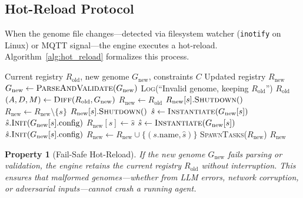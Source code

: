 \documentclass{article}
\newcommand{\REQUIRE}{\Require}
\newcommand{\ENSURE}{\Ensure}
\newtheorem{property}{Property}
\begin{document}
\subsection{Hot-Reload Protocol}

When the genome file changes---detected via filesystem watcher (\texttt{inotify} on Linux) or MQTT signal---the engine executes a hot-reload. Algorithm~\ref{alg:hot_reload} formalizes this process.

\begin{algorithm}[t]
\caption{Genome Hot-Reload with Consistency Guarantee}
\label{alg:hot_reload}
\begin{algorithmic}[1]
\REQUIRE Current registry $R_{\text{old}}$, new genome $G_{\text{new}}$, constraints $C$
\ENSURE Updated registry $R_{\text{new}}$
\State $G_{\text{new}} \leftarrow \textsc{ParseAndValidate}(G_{\text{new}})$
    \State \textsc{Log}(``Invalid genome, keeping $R_{\text{old}}$'')
    \State \Return $R_{\text{old}}$ 
\EndIf
\State $(A, D, M) \leftarrow \textsc{Diff}(R_{\text{old}}, G_{\text{new}})$ 
\State $R_{\text{new}} \leftarrow R_{\text{old}}$
 
    \State $R_{\text{new}}[s].\textsc{Shutdown}()$
    \State $R_{\text{new}} \leftarrow R_{\text{new}} \setminus \{s\}$
\EndFor
{} 
    \State $R_{\text{new}}[s].\textsc{Shutdown}()$
    \State $\hat{s} \leftarrow \textsc{Instantiate}(G_{\text{new}}[s])$
    \State $\hat{s}.\textsc{Init}(G_{\text{new}}[s].\text{config})$
    \State $R_{\text{new}}[s] \leftarrow \hat{s}$
\EndFor
{} 
        \State $\hat{s} \leftarrow \textsc{Instantiate}(G_{\text{new}}[s])$
        \State $\hat{s}.\textsc{Init}(G_{\text{new}}[s].\text{config})$
        \State $R_{\text{new}} \leftarrow R_{\text{new}} \cup \{(s.\text{name}, \hat{s})\}$
    \EndIf
\EndFor
\State \textsc{SpawnTasks}($R_{\text{new}}$) 
\State \Return $R_{\text{new}}$
\end{algorithmic}
\end{algorithm}

\begin{property}[Fail-Safe Hot-Reload]
If the new genome $G_{\text{new}}$ fails parsing or validation, the engine retains the current registry $R_{\text{old}}$ without interruption. This ensures that malformed genomes---whether from LLM errors, network corruption, or adversarial inputs---cannot crash a running agent.
\end{property}
\end{document}
